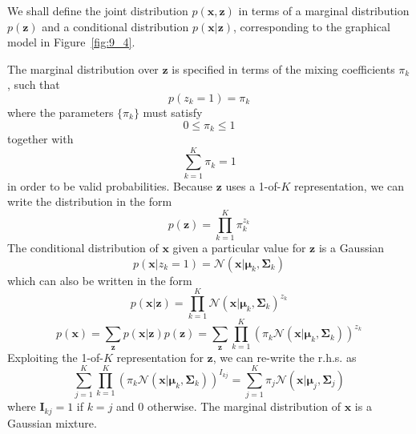 \documentclass[5p,sort&compress]{elsarticle}
\begin{document}
We shall define the joint distribution $p(\mathbf{x}, \mathbf{z})$ in terms of a marginal distribution $p(\mathbf{z})$ and a conditional distribution $p(\mathbf{x}|\mathbf{z})$, corresponding to the graphical model in Figure~\ref{fig:9_4}.

The marginal distribution over $\mathbf{z}$ is specified in terms of the mixing coefficients $\pi_k$, such that
\begin{equation}
p\left(z_{k}=1\right)=\pi_{k}
\end{equation}
where the parameters $\{\pi_k\}$ must satisfy
\begin{equation}
0 \leqslant \pi_{k} \leqslant 1
\end{equation}
together with 
\begin{equation}
\sum_{k=1}^{K} \pi_{k}=1
\end{equation}
in order to be valid probabilities. Because $\mathbf{z}$ uses a 1-of-$K$ representation, we can write the distribution in the form
\begin{equation}
p(\mathbf{z})=\prod_{k=1}^{K} \pi_{k}^{z_{k}}
\end{equation}
The conditional distribution of $\mathbf{x}$ given a particular value for $\mathbf{z}$ is a Gaussian
\begin{equation}
p\left(\mathbf{x} | z_{k}=1\right)=\mathcal{N}\left(\mathbf{x} | \boldsymbol{\mu}_{k}, \mathbf{\Sigma}_{k}\right)
\end{equation}
which can also be written in the form
\begin{equation}
p(\mathbf{x} | \mathbf{z})=\prod_{k=1}^{K} \mathcal{N}\left(\mathbf{x} | \boldsymbol{\mu}_{k}, \mathbf{\Sigma}_{k}\right)^{z_{k}}
\end{equation}
\begin{equation}
p(\mathbf{x})=\sum_{\mathbf{z}} p(\mathbf{x} | \mathbf{z}) p(\mathbf{z})=\sum_{\mathbf{z}} \prod_{k=1}^{K}\left(\pi_{k} \mathcal{N}\left(\mathbf{x} | \boldsymbol{\mu}_{k}, \mathbf{\Sigma}_{k}\right)\right)^{z_{k}}
\end{equation}
Exploiting the 1-of-$K$ representation for $\mathbf{z}$, we can re-write the r.h.s. as
\begin{equation}
\sum_{j=1}^{K} \prod_{k=1}^{K}\left(\pi_{k} \mathcal{N}\left(\mathbf{x} | \boldsymbol{\mu}_{k}, \mathbf{\Sigma}_{k}\right)\right)^{I_{k j}}=\sum_{j=1}^{K} \pi_{j} \mathcal{N}\left(\mathbf{x} | \boldsymbol{\mu}_{j}, \mathbf{\Sigma}_{j}\right)
\end{equation}
where $\mathbf{I}_{kj} = 1$ if $k = j$ and 0 otherwise. The marginal distribution of $\mathbf{x}$ is a Gaussian mixture.
\end{document}
